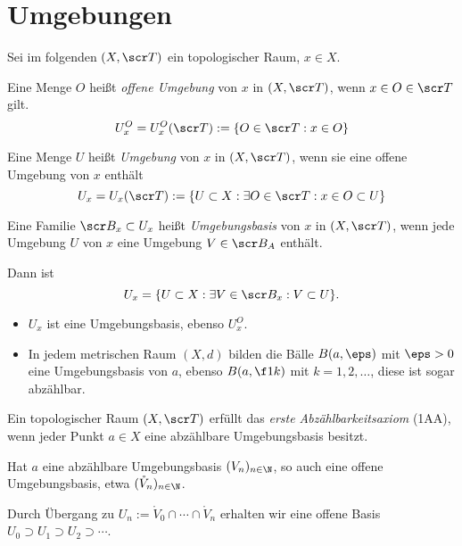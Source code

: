 \section{Umgebungen}


Sei im folgenden $(X, \scr T)$ ein topologischer Raum, $x \in X$.

\begin{df}
	Eine Menge $O$ heißt \emph{offene Umgebung} von $x$ in $(X,\scr T)$, wenn $x \in O \in \scr T$ gilt.
	\[
		U_x^O = U_x^O(\scr T)
		:= \{ O \in \scr T : x \in O \}
	\]

	Eine Menge $U$ heißt \emph{Umgebung} von $x$ in $(X, \scr T)$, wenn sie eine offene Umgebung von $x$ enthält
	\[
		U_x = U_x(\scr T)
		:= \{ U \subset X : \exists O \in \scr T : x \in O \subset U \}
	\]
\end{df}

\begin{df}
	Eine Familie $\scr B_x \subset U_x$ heißt \emph{Umgebungsbasis} von $x$ in $(X, \scr T)$, wenn jede Umgebung $U$ von $x$ eine Umgebung $V \in \scr B_A$ enthält.

	Dann ist
	\[
		U_x = \{ U \subset X : \exists V \in \scr B_x : V \subset U \}.
	\]
\end{df}

\begin{ex}
	\begin{itemize}
		\item
			$U_x$ ist eine Umgebungsbasis, ebenso $U_x^O$.
		\item
			In jedem metrischen Raum $(X,d)$ bilden die Bälle $B(a,\eps)$ mit $\eps > 0$ eine Umgebungsbasis von $a$, ebenso $B(a, \f 1k)$ mit $k= 1, 2, \dotsc$,
			diese ist sogar abzählbar.
	\end{itemize}
\end{ex}

\begin{df}
	Ein topologischer Raum $(X, \scr T)$ erfüllt das \emph{erste Abzählbarkeitsaxiom} (1AA), wenn jeder Punkt $a \in X$ eine abzählbare Umgebungsbasis besitzt.
	\begin{nt*}
		Hat $a$ eine abzählbare Umgebungsbasis $(V_n)_{n\in\N}$, so auch eine offene Umgebungsbasis, etwa $(\mathring V_n)_{n\in\N}$.

		Durch Übergang zu $U_n := \mathring V_0 \cap \dotsb \cap \mathring V_n$ erhalten wir eine offene Basis $U_0 \supset U_1 \supset U_2 \supset \dotsb$.
	\end{nt*}
\end{df}

